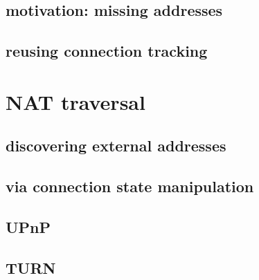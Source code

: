 \subsection{motivation: missing addresses}

\subsection{reusing connection tracking}

\section{NAT traversal}

\subsection{discovering external addresses}

\subsection{via connection state manipulation}

\subsection{UPnP}

\subsection{TURN}
